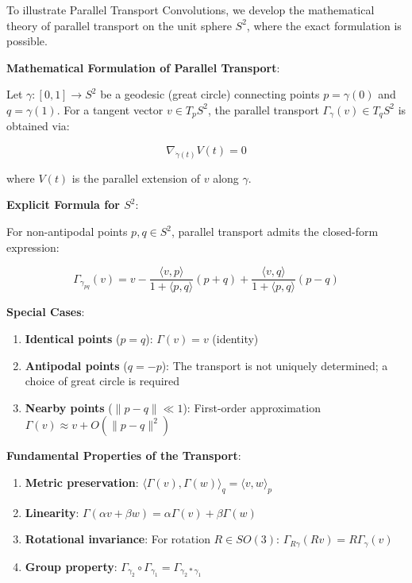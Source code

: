 \begin{example}

To illustrate Parallel Transport Convolutions, we develop the mathematical theory of parallel transport on the unit sphere $S^2$, where the exact formulation is possible.

\textbf{Mathematical Formulation of Parallel Transport}:

Let $\gamma: [0,1] \to S^2$ be a geodesic (great circle) connecting points $p = \gamma(0)$ and $q = \gamma(1)$. For a tangent vector $v \in T_p S^2$, the parallel transport $\Gamma_\gamma(v) \in T_q S^2$ is obtained via:

\begin{equation}
\nabla_{\dot{\gamma}(t)} V(t) = 0
\end{equation}

where $V(t)$ is the parallel extension of $v$ along $\gamma$.

\textbf{Explicit Formula for $S^2$}:

For non-antipodal points $p, q \in S^2$, parallel transport admits the closed-form expression:

\begin{equation}
\Gamma_{\gamma_{pq}}(v) = v - \frac{\langle v, p \rangle}{1 + \langle p, q \rangle}(p + q) + \frac{\langle v, q \rangle}{1 + \langle p, q \rangle}(p - q)
\end{equation}

\textbf{Special Cases}:
\begin{enumerate}
    \item \textbf{Identical points} ($p = q$): $\Gamma(v) = v$ (identity)
    \item \textbf{Antipodal points} ($q = -p$): The transport is not uniquely determined; a choice of great circle is required
    \item \textbf{Nearby points} ($\|p - q\| \ll 1$): First-order approximation $\Gamma(v) \approx v + O(\|p-q\|^2)$
\end{enumerate}

\textbf{Fundamental Properties of the Transport}:
\begin{enumerate}
    \item \textbf{Metric preservation}: $\langle \Gamma(v), \Gamma(w) \rangle_q = \langle v, w \rangle_p$
    \item \textbf{Linearity}: $\Gamma(\alpha v + \beta w) = \alpha \Gamma(v) + \beta \Gamma(w)$
    \item \textbf{Rotational invariance}: For rotation $R \in SO(3)$: $\Gamma_{R\gamma}(Rv) = R\Gamma_\gamma(v)$
    \item \textbf{Group property}: $\Gamma_{\gamma_2} \circ \Gamma_{\gamma_1} = \Gamma_{\gamma_2 * \gamma_1}$
\end{enumerate}


\end{example}
